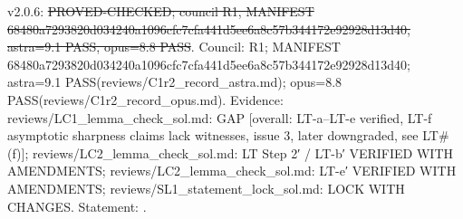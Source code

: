 \begin{theorem}\label{reg:W3-SAMP_LT_}
\end{theorem}
\begin{statusbox}
 v2.0.6: \st{PROVED-CHECKED; council R1, MANIFEST 68480a7293820d034240a1096cfc7cfa441d5ee6a8c57b344172e92928d13d40, astra=9.1 PASS, opus=8.8 PASS}. Council: R1; MANIFEST 68480a7293820d034240a1096cfc7cfa441d5ee6a8c57b344172e92928d13d40; astra=9.1 PASS(reviews/C1r2\_record\_astra.md); opus=8.8 PASS(reviews/C1r2\_record\_opus.md). Evidence: reviews/LC1\_lemma\_check\_sol.md: GAP [overall: LT-a–LT-e verified, LT-f asymptotic sharpness claims lack witnesses, issue 3, later downgraded, see LT\#(f)]; reviews/LC2\_lemma\_check\_sol.md: LT Step 2′ / LT-b′ VERIFIED WITH AMENDMENTS; reviews/LC2\_lemma\_check\_sol.md: LT-e′ VERIFIED WITH AMENDMENTS; reviews/SL1\_statement\_lock\_sol.md: LOCK WITH CHANGES. Statement: .
\end{statusbox}
